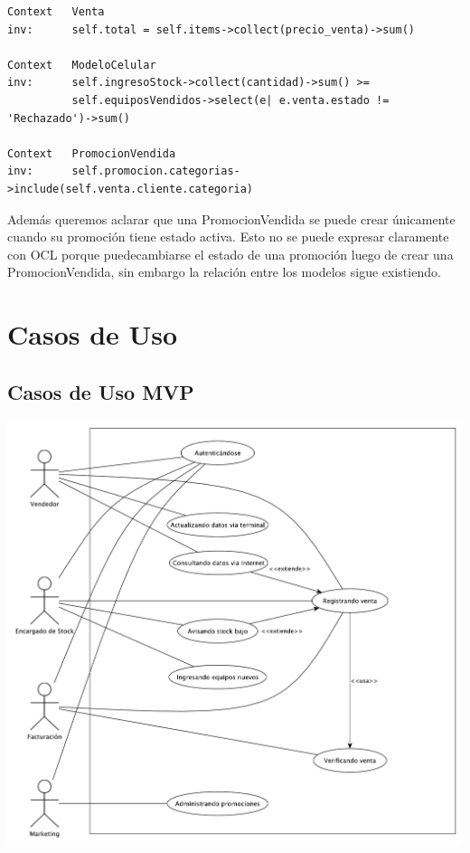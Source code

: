 \clearpage

\begin{verbatim}
Context   Venta
inv:      self.total = self.items->collect(precio_venta)->sum()

Context   ModeloCelular
inv:      self.ingresoStock->collect(cantidad)->sum() >= 
          self.equiposVendidos->select(e| e.venta.estado != 'Rechazado')->sum()

Context   PromocionVendida
inv:      self.promocion.categorias->include(self.venta.cliente.categoria)
\end{verbatim}

Además queremos aclarar que una PromocionVendida se puede crear únicamente cuando su promoción tiene estado activa. Esto no se puede expresar claramente con OCL porque puedecambiarse el estado de una promoción luego de crear una PromocionVendida, sin embargo la relación entre los modelos sigue existiendo.

\clearpage

\section{Casos de Uso}

\subsection{Casos de Uso MVP}

\includegraphics[width=1\textwidth]{./imagenes/casos_de_uso_mvp.pdf}

